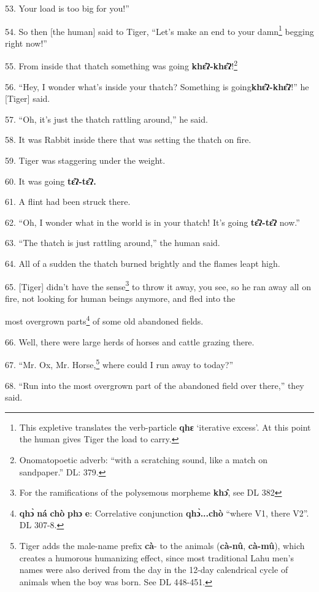 53. Your load is too big for you!''

54. So then [the human] said to Tiger, ``Let's make an end to your damn\footnote{This expletive translates the verb-particle \textbf{qhɛ} `iterative excess'. At this point the human gives Tiger the load to carry.} begging
right now!''

55. From inside that thatch something was going \textbf{khɛ̂ʔ-khɛ̂ʔ}!\footnote{Onomatopoetic adverb: ``with a scratching sound, like a match on sandpaper.'' DL: 379.}

56. ``Hey, I wonder what's inside your thatch? Something is going\textbf{khɛ̂ʔ-khɛ̂ʔ}!''
he [Tiger] said.

57. ``Oh, it's just the thatch rattling around,'' he said.

58. It was Rabbit inside there that was setting the thatch on fire.

59. Tiger was staggering under the weight.

60. It was going \textbf{tɛ̂ʔ-tɛ̂ʔ.}

61. A flint had been struck there.

62. ``Oh, I wonder what in the world is in your thatch! It's going \textbf{tɛ̂ʔ-tɛ̂ʔ}
now.''

63. ``The thatch is just rattling around,'' the human said.

64. All of a sudden the thatch burned brightly and the flames leapt high.

65. [Tiger] didn't have the sense\footnote{For the ramifications of the polysemous morpheme \textbf{khɔ̂}, see DL 382} to throw it away, you see, so he ran away
all on fire, not looking for human beings anymore, and fled into the

most overgrown parts\footnote{\textbf{qhɔ̀} \textbf{ná} \textbf{chò} \textbf{phɔ} \textbf{e}: Correlative conjunction \textbf{qhɔ̀...chò} ``where V1, there V2''. DL 307-8.} of some old abandoned fields.

66. Well, there were large herds of horses and cattle grazing there.

67. ``Mr. Ox, Mr. Horse,\footnote{Tiger adds the male-name prefix \textbf{cà}- to the animals (\textbf{cà-nû}, \textbf{cà-mû}), which creates a humorous humanizing effect, since most traditional Lahu men's names were also derived from the day in the 12-day calendrical cycle of animals when the boy was born. See DL 448-451.} where could I run away to today?''

68. ``Run into the most overgrown part of the abandoned field over there,'' they
said.


